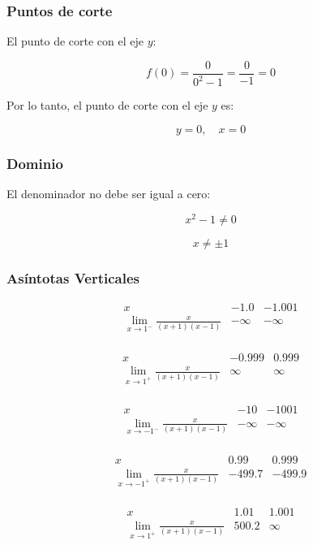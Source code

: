 \subsubsection*{Puntos de corte}

El punto de corte con el eje $y$:

\[f(0) = \frac{0}{0^2 - 1} = \frac{0}{-1} = 0\]

Por lo tanto, el punto de corte con el eje $y$ es:

\[y = 0, \quad x = 0\]

\subsubsection*{Dominio}

El denominador no debe ser igual a cero:

\[x^2 - 1 \neq 0\]

\[x \neq \pm 1\]

\subsubsection*{Asíntotas Verticales}

\[
\begin{array}{c|c|c}
x & -1.0 & -1.001 \\
\hline
\lim_{x \to 1^-} \frac{x}{(x+1)(x-1)} & -\infty & -\infty \\
\end{array}
\]

\[
\begin{array}{c|c|c}
x & -0.999 & 0.999 \\
\hline
\lim_{x \to 1^+} \frac{x}{(x+1)(x-1)} & \infty & \infty \\
\end{array}
\]

\[
\begin{array}{c|c|c}
x & -10 & -1001 \\
\hline
\lim_{x \to -1^-} \frac{x}{(x+1)(x-1)} & -\infty & -\infty \\
\end{array}
\]

\[
\begin{array}{c|c|c}
x & 0.99 & 0.999 \\
\hline
\lim_{x \to -1^+} \frac{x}{(x+1)(x-1)} & -499.7 & -499.9 \\
\end{array}
\]

\[
\begin{array}{c|c|c}
x & 1.01 & 1.001 \\
\hline
\lim_{x \to 1^+} \frac{x}{(x+1)(x-1)} & 500.2 & \infty \\
\end{array}
\]



